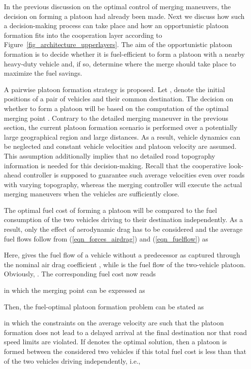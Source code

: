 \documentclass[journal]{IEEEtran}
\begin{document}
In the previous discussion on the optimal control of merging maneuvers, the decision on forming a platoon had already been made. Next we discuss how such a decision-making process can take place and how an opportunistic platoon formation fits into the cooperation layer according to Figure~\ref{fig_architecture_upperlayers}. The aim of the opportunistic platoon formation is to decide whether it is fuel-efficient to form a platoon with a nearby heavy-duty vehicle and, if so, determine where the merge should take place to maximize the fuel savings.

A pairwise platoon formation strategy is proposed. Let ,  denote the initial positions of a pair of vehicles and  their common destination. The decision on whether to form a platoon will be based on the computation of the optimal merging point . Contrary to the detailed merging maneuver in the previous section, the current platoon formation scenario is  performed over a potentially large geographical region and large distances. As a result, vehicle dynamics can be neglected and constant vehicle velocities  and platoon velocity  are assumed. This assumption additionally implies that no detailed road topography information is needed for this decision-making. Recall that the cooperative look-ahead controller is supposed to guarantee such average velocities even over roads with varying topography, whereas the merging controller will execute the actual merging maneuvers when the vehicles are sufficiently close.

The optimal fuel cost of forming a platoon will be compared to the fuel consumption of the two vehicles driving to their destination independently. As a result, only the effect of aerodynamic drag has to be considered and the average fuel flows follow from (\ref{eqn_forces_airdrag}) and (\ref{eqn_fuelflow}) as

Here,  gives the fuel flow of a vehicle without a predecessor as captured through the nominal air drag coefficient , while  is the fuel flow of the two-vehicle platoon. Obviously, . The corresponding fuel cost now reads

in which the merging point  can be expressed as

Then, the fuel-optimal platoon formation problem can be stated as

in which the constraints on the average velocity are such that the platoon formation does not lead to a delayed arrival at the final destination  nor that road speed limits are violated. If  denotes the optimal solution, then a platoon is formed between the considered two vehicles if this total fuel cost is less than that of the two vehicles driving independently, i.e.,
\end{document}
